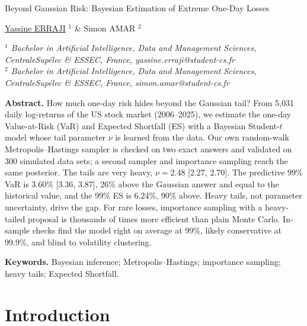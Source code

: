 \documentclass[12pt]{article}
\begin{document}

\begin{center}
{\Large
	{\sc Beyond Gaussian Risk: Bayesian Estimation of Extreme One-Day Losses}
}
\bigskip

\underline{Yassine ERRAJI} $^{1}$ \& Simon AMAR $^{2}$
\bigskip

{\it
$^{1}$ Bachelor in Artificial Intelligence, Data and Management Sciences,\\ CentraleSup\'elec \& ESSEC, France, yassine.erraji@student-cs.fr\\
$^{2}$ Bachelor in Artificial Intelligence, Data and Management Sciences,\\ CentraleSup\'elec \& ESSEC, France, simon.amar@student-cs.fr
}
\end{center}
\bigskip


{\bf Abstract.} How much one-day risk hides beyond the Gaussian tail? From 5,031 daily log-returns of the US stock market (2006--2025), we estimate the one-day Value-at-Risk (VaR) and Expected Shortfall (ES) with a Bayesian Student-$t$ model whose tail parameter $\nu$ is learned from the data. Our own random-walk Metropolis--Hastings sampler is checked on two exact answers and validated on 300 simulated data sets; a second sampler and importance sampling reach the same posterior. The tails are very heavy, $\nu = 2.48$ [2.27, 2.70]. The predictive 99\% VaR is 3.60\% [3.36, 3.87], 26\% above the Gaussian answer and equal to the historical value, and the 99\% ES is 6.24\%, 90\% above. Heavy tails, not parameter uncertainty, drive the gap. For rare losses, importance sampling with a heavy-tailed proposal is thousands of times more efficient than plain Monte Carlo. In-sample checks find the model right on average at 99\%, likely conservative at 99.9\%, and blind to volatility clustering.

{\bf Keywords.} Bayesian inference; Metropolis--Hastings; importance sampling; heavy tails; Expected Shortfall.

\bigskip\bigskip

\section{Introduction}\label{sec:introduction}
\end{document}

